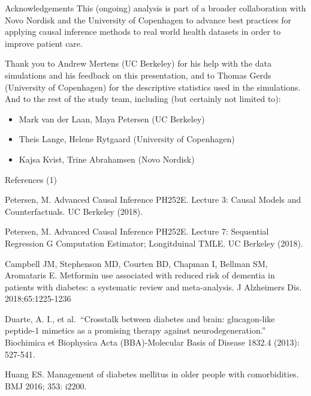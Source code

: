 \documentclass[
  ignorenonframetext,
  twocolumn]{beamer}
\providecommand{\tightlist}{%
  \setlength{\itemsep}{0pt}\setlength{\parskip}{0pt}}
\renewcommand{\tightlist}{\setlength{\itemsep}{2ex}\setlength{\parskip}{0pt}}
\begin{document}
\begin{frame}{Acknowledgements}
\protect\hypertarget{acknowledgements}{}
This (ongoing) analysis is part of a broader collaboration with Novo
Nordisk and the University of Copenhagen to advance best practices for
applying causal inference methods to real world health datasets in order
to improve patient care.

Thank you to Andrew Mertens (UC Berkeley) for his help with the data
simulations and his feedback on this presentation, and to Thomas Gerds
(University of Copenhagen) for the descriptive statistics used in the
simulations. And to the rest of the study team, including (but certainly
not limited to):

\begin{itemize}
\tightlist
\item
  Mark van der Laan, Maya Petersen (UC Berkeley)
\item
  Theis Lange, Helene Rytgaard (University of Copenhagen)
\item
  Kajsa Kvist, Trine Abrahamsen (Novo Nordisk)
\end{itemize}
\end{frame}

\begin{frame}{References (1)}
\protect\hypertarget{references-1}{}
\small

Petersen, M. Advanced Causal Inference PH252E. Lecture 3: Causal Models
and Counterfactuals. UC Berkeley (2018).

Petersen, M. Advanced Causal Inference PH252E. Lecture 7: Sequential
Regression G Computation Estimator; Longitduinal TMLE. UC Berkeley
(2018).

Campbell JM, Stephenson MD, Courten BD, Chapman I, Bellman SM,
Aromataris E. Metformin use associated with reduced risk of dementia in
patients with diabetes: a systematic review and meta-analysis. J
Alzheimers Dis. 2018;65:1225-1236

Duarte, A. I., et al.~``Crosstalk between diabetes and brain:
glucagon-like peptide-1 mimetics as a promising therapy against
neurodegeneration.'' Biochimica et Biophysica Acta (BBA)-Molecular Basis
of Disease 1832.4 (2013): 527-541.

Huang ES. Management of diabetes mellitus in older people with
comorbidities. BMJ 2016; 353: i2200.
\end{frame}
\end{document}
